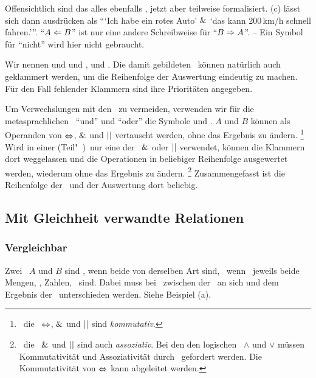 Offensichtlich sind das alles ebenfalls \Aussagen, jetzt aber teilweise formalisiert.
(c) lässt sich dann ausdrücken als \enquote{\enquote{Ich habe ein rotes Auto} $\metaandsym$ \enquote{das kann 200\,km/h schnell fahren.}}.
\enquote{$A \Leftarrow B$} ist nur eine andere Schreibweise für \enquote{$B \Rightarrow A$}.
-- Ein Symbol für \enquote{nicht} wird hier nicht gebraucht.

Wir nennen  und   und ,  und  .
Die damit gebildeten \Aussagen\ können natürlich auch geklammert werden, um die Reihenfolge der Auswertung eindeutig zu machen.
Für den Fall fehlender Klammern sind ihre Prioritäten  angegeben.

Um Verwechslungen mit den \Junktoren\ zu vermeiden, verwenden wir für die metasprachlichen \Operationen\ \enquote{und} und \enquote{oder} die Symbole \chrqt{$\metaandsym$} und \chrqt{$\metaorsym$}.
$A$ und $B$ können als Operanden von $\Leftrightarrow$, $\metaandsym$ und $\metaorsym$ vertauscht werden, ohne das Ergebnis zu ändern.%
\footnote{%
	\textDh\ die \Operationen\ $\Leftrightarrow$, $\metaandsym$ und $\metaorsym$ sind \emph{kommutativ}.
}
Wird in einer (Teil"~)\Aussage\ nur eine der \Operationen\ $\metaandsym$ oder $\metaorsym$ verwendet, können die Klammern dort weggelassen und die Operationen in beliebiger Reihenfolge ausgewertet werden, wiederum ohne das Ergebnis zu ändern.%
\footnote{%
	\textDh\ die \Operationen\ $\metaandsym$ und $\metaorsym$ sind auch \emph{assoziativ}.
	Bei den den logischen \Operationen\ $\land$ und $\lor$ müssen Kommutativität und Assoziativität durch \Axiome\ gefordert werden.
	Die Kommutativität von $\Leftrightarrow$ kann abgeleitet werden.
}
Zusammengefasst ist die Reihenfolge der \Operationen\ und der Auswertung dort beliebig.

\subsection{Mit Gleichheit verwandte Relationen}%
\label{sub:Gleichheit}

\subsubsection{Vergleichbar}%
\label{subsub:Vergleichbar}

Zwei \Objekte\ $A$ und $B$ sind , wenn beide von derselben Art sind, \textdh\ wenn \textzB\ jeweils beide Mengen, \Zeichenfolgen, Zahlen, \textusw\ sind.
Dabei muss bei \Formeln\ zwischen der \Formel\ an sich und dem Ergebnis der \Formel\ unterschieden werden. Siehe Beispiel (a).

